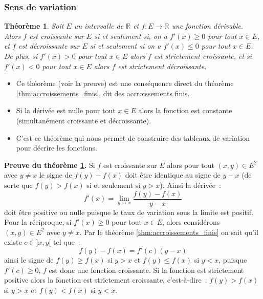 \documentclass[10pt,notheorems]{beamer}
\theoremstyle{plain}
\newtheorem{theorem}{Théorème}
\theoremstyle{definition} %
\begin{document}
\begin{frame}
  \frametitle{Sens de variation}
  \hypertarget{slide_sens_de_variation_1}{}

  \begin{theorem}\label{thm:sens_de_variation}
    Soit $E$ un intervalle de $\mathbb R$ et $f: E\rightarrow \mathbb R$ une fonction dérivable. Alors $f$ est croissante sur $E$ si et seulement si, on a $f'(x)\geq0$ pour tout $x\in E$, et $f$ est décroissante sur $E$ si et seulement si on a $f'(x)\leq 0$ pour tout $x\in E$. De plus, si $f'(x)>0$ pour tout $x\in E$  alors $f$  est strictement croissante, et si $f'(x)<0$ pour tout $x\in E$ alors $f$ est strictement décroissante.
  \end{theorem}

  \bigskip

  \begin{itemize}

  \item Ce théorème (voir la preuve) est une conséquence direct du théorème \hyperlink{slide_accroissements_finis_1}{\ref{thm:accroissements_finis}}, dit des accroissements finis.\newline

  \item Si la dérivée est nulle pour tout $x\in E$ alors la fonction est constante (simultanément croissante et décroissante).\newline

  \item C'est ce théorème qui nous permet de construire des tableaux de variation pour décrire les fonctions.

  \end{itemize}

\end{frame}


\begin{notes}

  \textbf{Preuve du théorème \hyperlink{slide_sens_de_variation_1}{\ref{thm:sens_de_variation}}.} Si $f$ est croissante sur $E$ alors pour tout $(x,y)\in E^2$ avec $y\neq x$ le signe de $f(y)-f(x)$ doit être identique au signe de $y-x$ (de sorte que $f(y)>f(x)$ si et seulement si $y>x$). Ainsi la dérivée~:
  \[
    f'(x) = \lim_{y\rightarrow x}\frac{f(y)-f(x)}{y-x}
  \]
  doit être positive ou nulle puisque le taux de variation sous la limite est positif. Pour la réciproque, si $f'(x)\geq 0$ pour tout $x\in E$, alors considérons $(x,y)\in E^2$ avec $y\neq x$. Par le théorème \hyperlink{slide_accroissements_finis_1}{\ref{thm:accroissements_finis}} on sait qu'il existe $c\in]x,y[$ tel que~:
  \[
    f(y)-f(x) = f'(c)(y-x)
  \]
  ainsi le signe de $f(y)\geq f(x)$ si $y>x$ et $f(y)\leq f(x)$ si $y<x$, puisque $f'(c)\geq 0$, $f$ est donc une fonction croissante. Si la fonction est strictement positive alors la fonction est strictement croissante, c'est-à-dire~: $f(y)>f(x)$ si $y>x$ et $f(y)<f(x)$ si $y<x$.

\end{notes}
\end{document}
